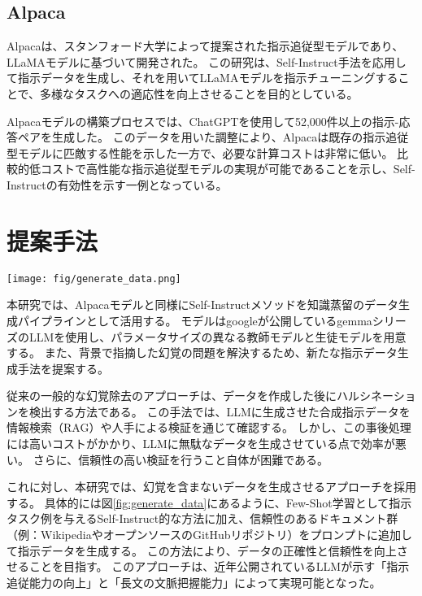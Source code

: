 \documentclass[twocolumn]{jsarticle}
\begin{document}
\subsection{Alpaca}
Alpaca\cite{Alpaca}は、スタンフォード大学によって提案された指示追従型モデルであり、LLaMAモデル\cite{Llama}に基づいて開発された。
この研究は、Self-Instruct手法を応用して指示データを生成し、それを用いてLLaMAモデルを指示チューニングすることで、多様なタスクへの適応性を向上させることを目的としている。

Alpacaモデルの構築プロセスでは、ChatGPTを使用して52,000件以上の指示-応答ペアを生成した。
このデータを用いた調整により、Alpacaは既存の指示追従型モデルに匹敵する性能を示した一方で、必要な計算コストは非常に低い。
比較的低コストで高性能な指示追従型モデルの実現が可能であることを示し、Self-Instructの有効性を示す一例となっている。


\section{提案手法}
\begin{figure*}[t]
    \centering
    \texttt{[image: fig/generate\_data.png]}
    \caption{提案手法を用いた生成例}
    \label{fig:generate_data}
\end{figure*}

本研究では、Alpacaモデルと同様にSelf-Instructメソッドを知識蒸留のデータ生成パイプラインとして活用する。
モデルはgoogleが公開しているgemmaシリーズ\cite{Gemma2}のLLMを使用し、パラメータサイズの異なる教師モデルと生徒モデルを用意する。
また、背景で指摘した幻覚の問題を解決するため、新たな指示データ生成手法を提案する。

従来の一般的な幻覚除去のアプローチは、データを作成した後にハルシネーションを検出する方法である。
この手法では、LLMに生成させた合成指示データを情報検索（RAG）や人手による検証を通じて確認する。
しかし、この事後処理には高いコストがかかり、LLMに無駄なデータを生成させている点で効率が悪い。
さらに、信頼性の高い検証を行うこと自体が困難である。

これに対し、本研究では、幻覚を含まないデータを生成させるアプローチを採用する。
具体的には図\ref{fig:generate_data}にあるように、Few-Shot学習として指示タスク例を与えるSelf-Instruct的な方法に加え、信頼性のあるドキュメント群（例：WikipediaやオープンソースのGitHubリポジトリ）をプロンプトに追加して指示データを生成する。
この方法により、データの正確性と信頼性を向上させることを目指す。
このアプローチは、近年公開されているLLMが示す「指示追従能力の向上」と「長文の文脈把握能力」によって実現可能となった。
\end{document}

